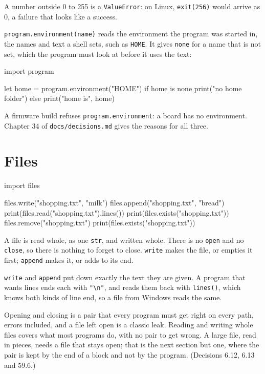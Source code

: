 A number outside 0 to 255 is a \verb|ValueError|: on Linux,
\verb|exit(256)| would arrive as 0, a failure that looks like a
success.

\verb|program.environment(name)| reads the environment the program
was started in, the names and text a shell sets, such as
\verb|HOME|. It gives \verb|none| for a name that is not set, which
the program must look at before it uses the text:

\begin{zeno}[run=no]
import program

let home = program.environment("HOME")
if home is none {
    print("no home folder")
} else {
    print("home is", home)
}
\end{zeno}

A firmware build refuses \verb|program.environment|: a board has no
environment. Chapter 34 of \texttt{docs/decisions.md} gives the
reasons for all three.

\section{Files}

\begin{zeno}
import files

files.write("shopping.txt", "milk\neggs\n")
files.append("shopping.txt", "bread\n")
print(files.read("shopping.txt").lines())
print(files.exists("shopping.txt"))
files.remove("shopping.txt")
print(files.exists("shopping.txt"))
\end{zeno}

A file is read whole, as one \verb|str|, and written whole. There is
no \verb|open| and no \verb|close|, so there is nothing to forget to
close. \verb|write| makes the file, or empties it first;
\verb|append| makes it, or adds to its end.

\verb|write| and \verb|append| put down exactly the text they are
given. A program that wants lines ends each with \verb|"\n"|, and
reads them back with \verb|lines()|, which knows both kinds of line
end, so a file from Windows reads the same.

\begin{why}
Opening and closing is a pair that every program must get right on
every path, errors included, and a file left open is a classic leak.
Reading and writing whole files covers what most programs do, with no
pair to get wrong. A large file, read in pieces, needs a file that
stays open; that is the next section but one, where the pair is kept
by the end of a block and not by the program. (Decisions 6.12, 6.13
and 59.6.)
\end{why}

